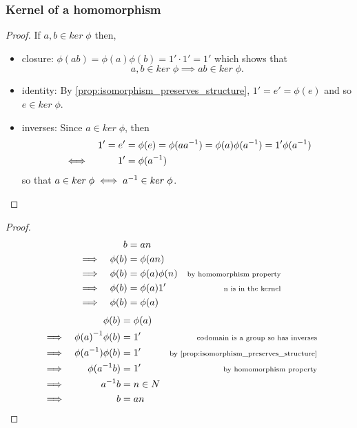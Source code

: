 \documentclass[MathsNotesBase.tex]{subfiles}
\begin{document}
{		\subsubsection{Kernel of a homomorphism}
	
		\begin{proof}
			If $a,b \in ker \; \phi$ then,
			\begin{itemize}
				\item{closure: $ \phi(ab) = \phi(a)\phi(b) = 1' \cdot 1' = 1' $ which shows that 
					\[ a,b \in ker \; \phi \implies ab \in ker \; \phi. \] }
				\item{identity: By \autoref{prop:isomorphism_preserves_structure}, $ 1' = e' = \phi(e) $ and so $e \in ker \; \phi $.}
				\item{inverses: Since $ a \in ker \; \phi $, then 
					\begin{align*}
					&&1' = e' &= \phi(e) = \phi(a{a}^{-1}) = \phi(a)\phi({a}^{-1}) = 1'\phi({a}^{-1}) \\
					&\iff &1' &= \phi({a}^{-1})
					\end{align*}
					so that $ a \in ker \; \phi \iff {a}^{-1} \in ker \; \phi $.}
			\end{itemize}
		\end{proof}
	
		\begin{proof}
			\begin{align*}
			&& b &= an  \\
			&\implies & \phi(b) &= \phi(an) \\
			&\implies & \phi(b) &= \phi(a)\phi(n) &\text{\scriptsize{by homomorphism property}} \\
			&\implies & \phi(b) &= \phi(a)1' &\text{\scriptsize{n is in the kernel}} \\
			&\implies & \phi(b) &= \phi(a) \\
			\end{align*}
			\begin{align*}
			&& \phi(b) &= \phi(a) \\
			&\implies & \inv{\phi(a)}\phi(b) &= 1'  &\sidecomment{codomain is a group so has inverses} \\
			&\implies & \phi(\inv{a})\phi(b) &= 1' &\sidecomment{by \autoref{prop:isomorphism_preserves_structure}} \\
			&\implies & \phi(\inv{a}b) &= 1' &\sidecomment{by homomorphism property} \\
			&\implies & \inv{a}b &= n \in N \\
			&\implies & b &= an \\
			\end{align*}
		\end{proof}
		
}
\end{document}
